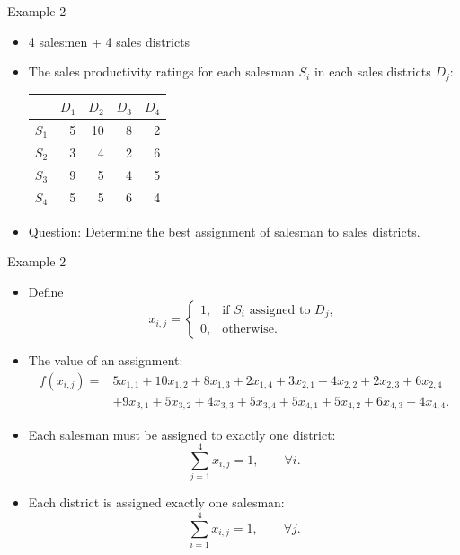 \documentclass[aspectratio=169,hyperref,UTF8,CJK]{beamer}
\begin{document}
\begin{frame}{Example 2}
  \begin{itemize}
    \item 4 salesmen + 4 sales districts
    \item The sales productivity ratings for each salesman $S_i$ in each sales districts $D_j$:
      \begin{center}
        \begin{tabular}{c|rrrr}
          & $D_1$ & $D_2$ & $D_3$ & $D_4$\\ \hline
          $S_1$ & 5 & 10 & 8 & 2\\
          $S_2$ & 3 & 4 & 2 & 6\\
          $S_3$ & 9 & 5 & 4 & 5\\
          $S_4$ & 5 & 5 & 6 & 4
        \end{tabular}
      \end{center}
    \item Question: Determine the best assignment of salesman to sales districts.
  \end{itemize}
\end{frame}

\begin{frame}{Example 2}
  \footnotesize
  \begin{itemize}
    \item Define
      \begin{equation}\tag{10}
        x_{i,j}=\begin{cases}1,&\text{if $S_i$ assigned to $D_j$},\\0,&\text{otherwise.}\end{cases}
      \end{equation}
    \item The value of an assignment:
      \begin{align*}
        f(x_{i,j})={}&5x_{1,1}+10x_{1,2}+8x_{1,3}+2x_{1,4}+3x_{2,1}+4x_{2,2}+2x_{2,3}+6x_{2,4}\\
        &+9x_{3,1}+5x_{3,2}+4x_{3,3}+5x_{3,4}+5x_{4,1}+5x_{4,2}+6x_{4,3}+4x_{4,4}.
      \end{align*}
    \item Each salesman must be assigned to exactly one district:
      \begin{equation}\tag{11}
        \sum_{j=1}^{4}x_{i,j}=1,\qquad \forall i.
      \end{equation}
    \item Each district is assigned exactly one salesman:
      \begin{equation}\tag{12}
        \sum_{i=1}^{4}x_{i,j}=1,\qquad \forall j.
      \end{equation}
  \end{itemize}
\end{frame}
\end{document}
